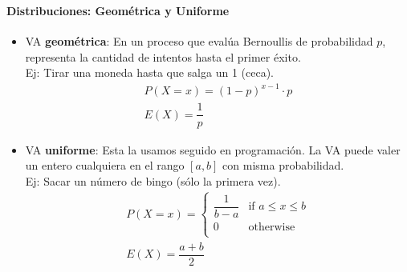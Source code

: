 \documentclass[../main.tex]{subfiles}
\begin{document}
\begin{frame}
  \frametitle{\SECTIONA}
  \framesubtitle{Distribuciones: Geométrica y Uniforme}

  \begin{itemize}
    \item VA \textbf{geométrica}: En un proceso que evalúa Bernoullis de probabilidad \(p\), representa la cantidad de intentos hasta el primer éxito. \\
      Ej: Tirar una moneda hasta que salga un 1 (ceca).
      \begin{gather*}
        P(X = x) = (1 - p)^{x - 1} \cdot p \\
        E(X) = \dfrac{1}{p}
      \end{gather*}
    \item<2-> VA \textbf{uniforme}: Esta la usamos seguido en programación. La VA puede valer un entero cualquiera en el rango \([a, b]\) con misma probabilidad. \\
      Ej: Sacar un número de bingo (sólo la primera vez).
      \begin{gather*}
        P(X = x) = \begin{cases} \dfrac{1}{b - a} & \text{if } a \leq x \leq b \\ 0 & \text{otherwise} \\ \end{cases} \\
        E(X) = \dfrac{a + b}{2}
      \end{gather*}
  \end{itemize}
\end{frame}
\end{document}

